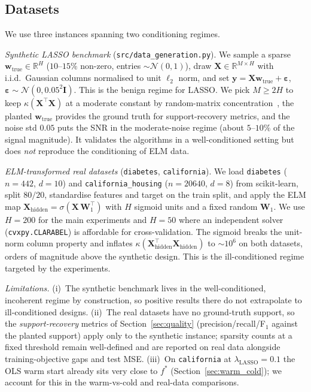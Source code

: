 \subsection{Datasets}
\label{sec:datasets}
We use three instances spanning two conditioning regimes.

\emph{Synthetic LASSO benchmark} (\texttt{src/data\_generation.py}). We
sample a sparse $\mathbf{w}_\text{true}\in\mathbb{R}^{H}$
($10$--$15\%$ non-zero, entries $\sim\mathcal{N}(0,1)$), draw
$\mathbf{X}\in\mathbb{R}^{M\times H}$ with i.i.d.\ Gaussian columns
normalised to unit $\ell_{2}$ norm, and set
$\mathbf{y} = \mathbf{X}\mathbf{w}_\text{true} + \boldsymbol{\varepsilon}$,
$\boldsymbol{\varepsilon}\sim\mathcal{N}(0, 0.05^{2}\mathbf{I})$. This is the benign regime for LASSO. We pick $M\ge 2H$ to keep
$\kappa(\mathbf{X}^{\top}\mathbf{X})$ at a moderate constant by
random-matrix concentration~\cite{hastie2009elements}, the planted
$\mathbf{w}_\text{true}$ provides the ground truth for support-recovery
metrics, and the noise std $0.05$ puts the SNR in the moderate-noise
regime (about $5$--$10\%$ of the signal magnitude). It validates the
algorithms in a well-conditioned setting but does \emph{not} reproduce the
conditioning of ELM data.

\emph{ELM-transformed real datasets} (\texttt{diabetes},
\texttt{california}). We load \texttt{diabetes} ($n=442$, $d=10$)
\cite{efron2004least} and \texttt{california\_housing} ($n=20640$,
$d=8$) \cite{pace1997sparse} from scikit-learn, split $80/20$,
standardise features and target on the train split, and apply the ELM
map $\mathbf{X}_\text{hidden}=\sigma(\mathbf{X}\,\mathbf{W}_{1}^{\top})$
with $H$ sigmoid units and a fixed random $\mathbf{W}_{1}$. We use
$H=200$ for the main experiments and $H=50$ where an independent
solver (\texttt{cvxpy.CLARABEL}) is affordable for cross-validation. The
sigmoid breaks the unit-norm column property and inflates
$\kappa(\mathbf{X}_\text{hidden}^{\top}\mathbf{X}_\text{hidden})$ to
$\sim 10^{6}$ on both datasets, orders of magnitude above the synthetic
design. This is the ill-conditioned regime targeted by the experiments.

\emph{Limitations.} (i)~The synthetic benchmark lives in the
well-conditioned, incoherent regime by construction, so positive results
there do not extrapolate to ill-conditioned designs. (ii)~The real
datasets have no ground-truth support, so the
\emph{support-recovery} metrics of Section~\ref{sec:quality}
(precision/recall/F$_1$ against the planted support) apply only to the
synthetic instance; sparsity counts at a fixed threshold remain
well-defined and are reported on real data alongside training-objective
gaps and test MSE. (iii)~On
\texttt{california} at $\lambda_\text{LASSO}=0.1$ the OLS warm start
already sits very close to $f^{*}$ (Section~\ref{sec:warm_cold}); we
account for this in the warm-vs-cold and real-data comparisons.

